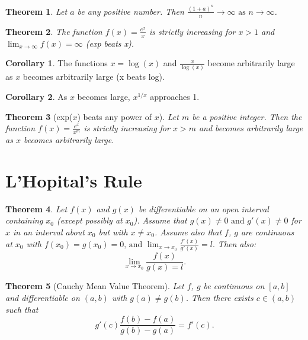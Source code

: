 \documentclass[11pt,a4paper]{article}
\newtheorem{theorem}{Theorem}
\theoremstyle{definition}
\newtheorem{corollary}{Corollary}
\begin{document}
\begin{theorem}
    Let $ a $ be any positive number. Then $ \frac{(1 + a)^n}{n} \to \infty \text{ as } n \to \infty $.
\end{theorem}

\begin{theorem}
    The function $ f(x) = \frac{e^x}{x}$ is strictly increasing for $ x > 1 $ and $ \lim_{x \to \infty} f(x) = \infty $ (exp beats x).
\end{theorem}

\begin{corollary}
    The functions $ x = \log (x) $ and $ \frac{x}{\log(x)} $ become arbitrarily large as $ x $ becomes arbitrarily large (x beats log).
\end{corollary}

\begin{corollary}
    As $ x $ becomes large, $ x^{1/x} $ approaches 1. 
\end{corollary}

\begin{theorem}[exp($ x $) beats any power of $ x $]
    Let $ m $ be a positive integer. Then the function $ f(x) = \frac{e^x}{x^m} $ is strictly increasing for $ x > m $ and becomes arbitrarily large as $ x $ becomes arbitrarily large.
\end{theorem}

\section{L'Hopital's Rule}

\begin{theorem}
    Let $ f(x) $ and $ g(x) $ be differentiable on an open interval containing $ x_0 $ (except possibly at $ x_0 $). Assume that $ g(x) \neq 0 \text{ and } g'(x) \neq 0 $ for $ x $ in
    an interval about $ x_0 $ but with $ x \neq x_0 $.  Assume also that $ f $, $ g $ are continuous at $ x_0 $ with $ f(x_0) = g(x_0) = 0 \text{, and } \lim_{x \to x_0} \frac{f'(x)}{g'(x)} = l. $
    Then also:
    \[ \lim_{x \to x_0} \frac{f(x)}{g(x) = l}.\]
\end{theorem}

\begin{theorem}[Cauchy Mean Value Theorem]
    Let $ f $, $ g $ be continuous on $ [a, b] $ and differentiable on $ (a, b) $ with $ g(a) \neq g(b) $. Then there exists $ c \in (a, b) $ such that 
    \[ g'(c)\frac{f(b) - f(a)}{g(b) - g(a)} = f'(c).\]
\end{theorem}
\end{document}
